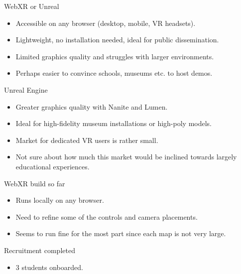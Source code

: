 \begin{frame}{WebXR or Unreal}
    \begin{itemize}
        \item Accessible on any browser (desktop, mobile, VR headsets).
        \item Lightweight, no installation needed, ideal for public dissemination.
        \item Limited graphics quality and struggles with larger environments.
	\item Perhaps easier to convince schools, museums etc. to host demos.
    \end{itemize}    
\end{frame}
\begin{frame}{Unreal Engine}
  \begin{itemize}
        \item Greater graphics quality with Nanite and Lumen.
        \item Ideal for high-fidelity museum installations or high-poly models.
	\item Market for dedicated VR users is rather small.
	\item Not sure about how much this market would be inclined towards largely educational experiences.
  \end{itemize}
\end{frame}
\begin{frame}{WebXR build so far}
  \begin{itemize}
    \item Runs locally on any browser.
    \item Need to refine some of the controls and camera placements.
    \item Seems to run fine for the most part since each map is not very large.
  \end{itemize}
\end{frame}
\begin{frame}{Recruitment completed}
  \begin{itemize}
    \item 3 students onboarded.
  \end{itemize}
\end{frame}
